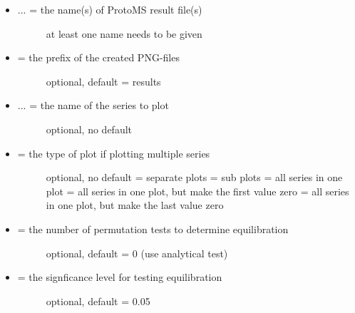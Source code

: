 \documentclass[letterpaper,10pt,english]{sphinxmanual}
\begin{document}
\begin{itemize}
\item {} \begin{description}
\item[{ ... = the name(s) of ProtoMS result file(s)}] \leavevmode
at least one name needs to be given

\end{description}

\item {} \begin{description}
\item[{ = the prefix of the created PNG-files}] \leavevmode
optional, default = results

\end{description}

\item {} \begin{description}
\item[{ ... = the name of the series to plot}] \leavevmode
optional, no default

\end{description}

\item {} \begin{description}
\item[{ = the type of plot if plotting multiple series}] \leavevmode
optional, no default
 = separate plots
 = sub plots
 = all series in one plot
 = all series in one plot, but make the first value zero
 = all series in one plot, but make the last value zero

\end{description}

\item {} \begin{description}
\item[{ = the number of permutation tests to determine equilibration}] \leavevmode
optional, default = 0 (use analytical test)

\end{description}

\item {} \begin{description}
\item[{ = the signficance level for testing equilibration}] \leavevmode
optional, default = 0.05


\end{description}
\end{itemize}
\end{document}
